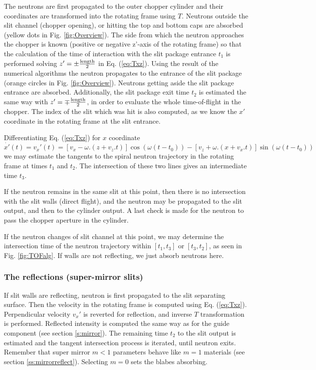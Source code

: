 The neutrons are first propagated to the outer chopper cylinder and their coordinates are transformed into the rotating frame using $T$. Neutrons outside the slit channel (chopper opening), or hitting the top and bottom caps are absorbed (yellow dots in Fig. \ref{fig:Overview}). The side from which the neutron approaches the chopper is known (positive or negative z'-axis of the rotating frame) so that the calculation of the time of interaction with the slit package entrance $t_1$ is performed solving $z' = \pm \frac{\rm length}{2}$ in Eq. (\ref{eq:Txz}). Using the result of the numerical algorithms the neutron propagates to the entrance of the slit package (orange circles in Fig. \ref{fig:Overview}). Neutrons getting aside the slit package entrance are absorbed. Additionally, the slit package exit time $t_2$ is estimated the same way with $z' = \mp \frac{\rm length}{2}$, in order to evaluate the whole time-of-flight in the chopper. The index of the slit which was hit is also computed, as we know the $x'$ coordinate in the rotating frame at the slit entrance.

Differentiating Eq. (\ref{eq:Txz}) for $x$ coordinate
\begin{equation}
\dot{x'}(t) = v_x'(t) = [v_x-\omega.(z+v_z.t)]\cos(\omega(t-t_0)) - [v_z+\omega.(x+v_x.t)]\sin(\omega(t-t_0))
\end{equation}
we may estimate the tangents to the spiral neutron trajectory in the rotating frame at times $t_1$ and $t_2$. The intersection of these two lines gives an intermediate time $t_3$.

If the neutron remains in the same slit at this point, then there is no intersection with the slit walls (direct flight), and the neutron may be propagated to the slit output, and then to the cylinder output. A last check is made for the neutron to pass the chopper aperture in the cylinder.

If the neutron changes of slit channel at this point, we may determine the intersection time of the neutron trajectory within $[ t_1, t_3 ]$ or $[ t_3, t_2 ]$, as seen in Fig. \ref{fig:TOFalg}. If walls are not reflecting, we just absorb neutrons here.

\subsubsection{The reflections (super-mirror slits)}

If slit walls are reflecting, neutron is first propagated to the slit separating surface. Then the velocity in the rotating frame is computed using Eq. (\ref{eq:Txz}). Perpendicular velocity $v_x'$ is reverted for reflection, and inverse $T$ transformation is performed. Reflected intensity is computed the same way as for the guide component (see section \ref{s:mirror}). The remaining time $t_2$ to the slit output is estimated and the tangent intersection process is iterated, until neutron exits. Remember that super mirror $m < 1$ parameters behave like $m=1$ materials (see section \ref{ss:mirrorreflect}). Selecting $m=0$ sets the blabes absorbing.

